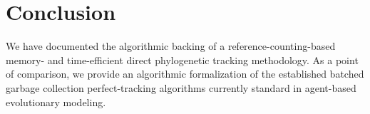 \section{Conclusion} \label{sec:conclusion}



We have documented the algorithmic backing of a reference-counting-based memory- and time-efficient direct phylogenetic tracking methodology.
As a point of comparison, we provide an algorithmic formalization of the established batched garbage collection perfect-tracking algorithms currently standard in agent-based evolutionary modeling.

